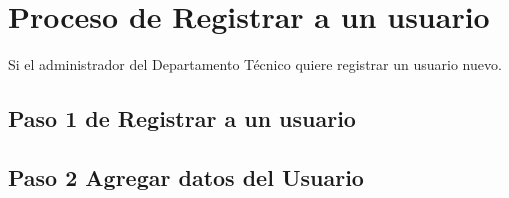 \chapter{Proceso de Registrar a un usuario}
	Si el administrador del Departamento Técnico quiere registrar un usuario nuevo.	
	 
	
\section{Paso 1 de Registrar a un usuario}
	

\section{Paso 2 Agregar datos del Usuario}
	



